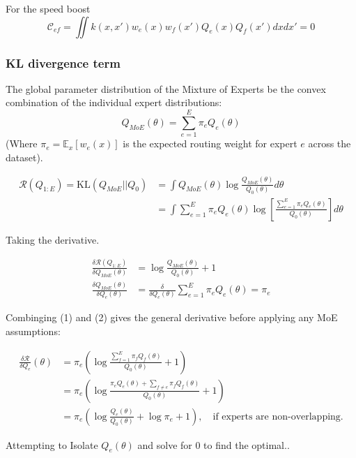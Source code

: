 \documentclass[mstat,12pt]{unswthesis}
\begin{document}
For the speed boost
$$\mathcal{C}_{ef} = \iint k(x, x') w_e(x) w_f(x') Q_e(x) Q_f(x') dx dx' =0$$


\subsubsection{KL divergence term}
The global parameter distribution of the Mixture of Experts be the convex combination of the individual expert distributions:$$Q_{MoE}(\theta) = \sum_{e=1}^E \pi_e Q_e(\theta)$$
(Where $\pi_e = \mathbb{E}_x[w_e(x)]$ is the expected routing weight for expert $e$ across the dataset).

\begin{align*}
    \mathcal{R}(Q_{1:E}) = \text{KL}(Q_{MoE} || Q_0) & = \int Q_{MoE}(\theta) \log \frac{Q_{MoE}(\theta)}{Q_0(\theta)} d\theta                                              \\
                                                     & = \int \sum_{e=1}^E \pi_e Q_e(\theta) \log \left [ \frac{\sum_{e=1}^E \pi_e Q_e(\theta)}{Q_0(\theta)} \right]d\theta
\end{align*}


Taking the derivative.

\begin{align}
    \frac{\delta\mathcal{R}(Q_{1:E})}{\delta Q_{MoE}(\theta)} & = \log \frac{Q_{MoE}(\theta)}{Q_0(\theta)} + 1                                 \\
    \frac{\delta Q_{MoE}(\theta)}{\delta Q_{e}(\theta)}       & = \frac{\delta}{{\delta Q_{e}(\theta)}} \sum_{e=1}^E \pi_e Q_e(\theta) = \pi_e
\end{align}


Combinging (1) and (2) gives the general derivative before applying any MoE assumptions:

\begin{align*}
    \frac{\delta \mathcal{R}}{\delta Q_e}(\theta)
     & = \pi_e \left( \log \frac{\sum_{f=1}^E \pi_f Q_f(\theta)}{Q_0(\theta)} + 1 \right)                        \\
     & = \pi_e \left( \log \frac{\pi_e Q_e(\theta) + \sum_{f \neq e} \pi_f Q_f(\theta)}{Q_0(\theta)} + 1 \right) \\
     & = \pi_e \left( \log \frac{Q_e(\theta)}{Q_0(\theta)} + \log \pi_e + 1 \right),
    \quad \text{if experts are non-overlapping.}
\end{align*}

Attempting to Isolate $Q_e(\theta)$ and solve for 0 to find the optimal..
\end{document}
